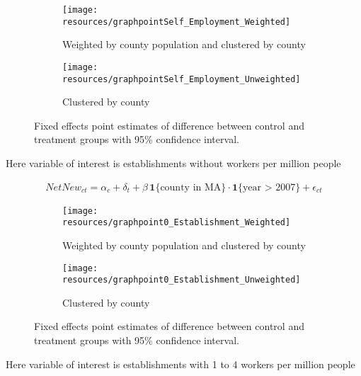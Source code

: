 \documentclass[12pt]{article}
\begin{document}
\begin{center}
	\centering
	
\end{center}

\begin{figure}[H]
	\centering
	\begin{subfigure}[b]{0.495\textwidth}
	    \texttt{[image: resources/graphpointSelf\_Employment\_Weighted]}
	    \caption{Weighted by county population and clustered by county}
	\end{subfigure}
	\begin{subfigure}[b]{0.495\textwidth}
		  \texttt{[image: resources/graphpointSelf\_Employment\_Unweighted]}
		  \caption{Clustered by county}
	\end{subfigure}
	\caption{Fixed effects point estimates of difference between control and treatment groups with 95\% confidence interval.}
\end{figure}


\pagebreak

Here variable of interest is establishments without workers per million people

\begin{align}
NetNew_{ct} = \alpha_c + \delta_t + \beta \, \mathbf{1}\{\text{county in MA}\} \cdot \mathbf{1}\{\text{year > 2007}\} + \epsilon_{ct}
\end{align}

\begin{center}
	\centering
	
\end{center}

\begin{figure}[H]
	\centering
	\begin{subfigure}[b]{0.495\textwidth}
	    \texttt{[image: resources/graphpoint0\_Establishment\_Weighted]}
	    \caption{Weighted by county population and clustered by county}
	\end{subfigure}
	\begin{subfigure}[b]{0.495\textwidth}
		  \texttt{[image: resources/graphpoint0\_Establishment\_Unweighted]}
		  \caption{Clustered by county}
	\end{subfigure}
	\caption{Fixed effects point estimates of difference between control and treatment groups with 95\% confidence interval.}
\end{figure}


\pagebreak


Here variable of interest is establishments with 1 to 4 workers per million people
\end{document}
